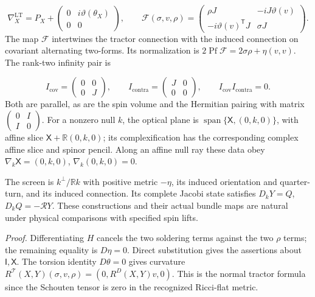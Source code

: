 \documentclass[
  english,
  11pt,
  reqno]{amsart}
\begin{document}
\label{eq:online-canonical-local-twistor-model} \[
\nabla_X^{\mathrm{LT}}
=P_X+\begin{pmatrix}0&i\vartheta(\theta_X)\\0&0\end{pmatrix},
\qquad
\mathcal F(\sigma,v,\rho)
=\begin{pmatrix}
\rho J&-iJ\vartheta(v)\\
-i\vartheta(v)^{\mathsf T}J&\sigma J
\end{pmatrix}.
\] The map \(\mathcal F\) intertwines the tractor connection with the
induced connection on covariant alternating two-forms. Its normalization
is \(2\operatorname{Pf}\mathcal F=2\sigma\rho+\eta(v,v)\). The rank-two
infinity pair is

\label{eq:online-canonical-infinity-pair} \[
I_{\mathrm{cov}}=\begin{pmatrix}0&0\\0&J\end{pmatrix},\qquad
I_{\mathrm{contra}}=\begin{pmatrix}J&0\\0&0\end{pmatrix},\qquad
I_{\mathrm{cov}}I_{\mathrm{contra}}=0.
\] Both are parallel, as are the spin volume and the Hermitian pairing
with matrix
\(\left(\begin{smallmatrix}0&I\\I&0\end{smallmatrix}\right)\). For a
nonzero null \(k\), the optical plane is
\(\operatorname{span}\{\mathsf X,(0,k,0)\}\), with affine slice
\(\mathsf X+\mathbb R(0,k,0)\); its complexification has the
corresponding complex affine slice and spinor pencil. Along an affine
null ray these data obey \(\nabla_k\mathsf X=(0,k,0)\),
\(\nabla_k(0,k,0)=0\).

The screen is \(k^\perp/\mathbb Rk\) with positive metric \(-\eta\), its
induced orientation and quarter-turn, and its induced connection. Its
complete Jacobi state satisfies \(D_kY=Q\), \(D_kQ=-\mathcal RY\). These
constructions and their actual bundle maps are natural under physical
comparisons with specified spin lifts.

\emph{Proof.} Differentiating \(H\) cancels the two soldering terms
against the two \(\rho\) terms; the remaining equality is \(D\eta=0\).
Direct substitution gives the assertions about \(\mathsf I,\mathsf X\).
The torsion identity \(D\theta=0\) gives curvature
\(R^{\mathcal T}(X,Y)(\sigma,v,\rho)=(0,R^D(X,Y)v,0)\). This is the
normal tractor formula since the Schouten tensor is zero in the
recognized Ricci-flat metric.
\end{document}
